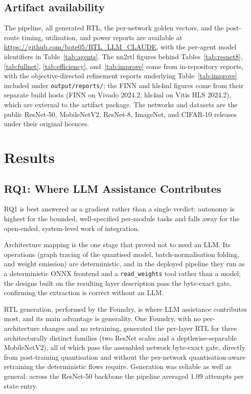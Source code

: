 \documentclass[acmtog,authorversion]{acmart}
\begin{document}
\subsection{Artifact availability}
The pipeline, all generated RTL, the per-network golden vectors, and the post-route timing, utilisation, and power reports are available at \url{https://github.com/bote05/RTL_LLM_CLAUDE}, with the per-agent model identifiers in Table~\ref{tab:agents}. The nn2rtl figures behind Tables~\ref{tab:resnet8}, \ref{tab:fullnet}, \ref{tab:efficiency}, and~\ref{tab:improve} come from in-repository reports, with the objective-directed refinement reports underlying Table~\ref{tab:improve} included under \texttt{output/reports/}; the FINN and hls4ml figures come from their separate build hosts (FINN on Vivado 2024.2, hls4ml on Vitis HLS 2024.2), which are external to the artifact package. The networks and datasets are the public ResNet-50, MobileNetV2, ResNet-8, ImageNet, and CIFAR-10 releases under their original licences.

\section{Results}
\label{sec:results}

\subsection{RQ1: Where LLM Assistance Contributes}\label{sec:rq1}

RQ1 is best answered as a gradient rather than a single verdict: autonomy is highest for the bounded, well-specified per-module tasks and falls away for the open-ended, system-level work of integration.

Architecture mapping is the one stage that proved not to need an LLM. Its operations (graph tracing of the quantised model, batch-normalisation folding, and weight emission) are deterministic, and in the deployed pipeline they run as a deterministic ONNX frontend and a \texttt{read\_weights} tool rather than a model; the designs built on the resulting layer description pass the byte-exact gate, confirming the extraction is correct without an LLM.

RTL generation, performed by the Foundry, is where LLM assistance contributes most, and its main advantage is generality. One Foundry, with no per-architecture changes and no retraining, generated the per-layer RTL for three architecturally distinct families (two ResNet scales and a depthwise-separable MobileNetV2), all of which pass the assembled network byte-exact gate, directly from post-training quantisation and without the per-network quantisation-aware retraining the deterministic flows require. Generation was reliable as well as general: across the ResNet-50 backbone the pipeline averaged 1.09 attempts per state entry.
\end{document}
